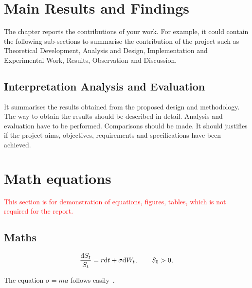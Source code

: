 \section{Main Results and Findings}
The chapter reports the contributions of your work.  For example, it could contain the following sub-sections to summarise the contribution of the project such as Theoretical Development, Analysis and Design, Implementation and Experimental Work, Results, Observation and Discussion.



\subsection{Interpretation Analysis and Evaluation}
	It summarises the results obtained from the proposed design and methodology. The way to obtain the results should be described in detail. Analysis and evaluation have to be performed. Comparisons should be made. It should justifies if the project aims, objectives, requirements and specifications have been achieved.


\section{Math equations}
\textcolor{red}{This section is for demonstration of equations, figures, tables, which is not required for the report.}
\subsection{Maths}
\begin{equation}\label{eq:BS}
\frac{\mathrm{d} S_t}{S_t} = r \mathrm{d} t + \sigma \mathrm{d} W_t,
\qquad S_0>0,
\end{equation}

The equation $\sigma = m a$ follows easily~\cite{Doe11}.



